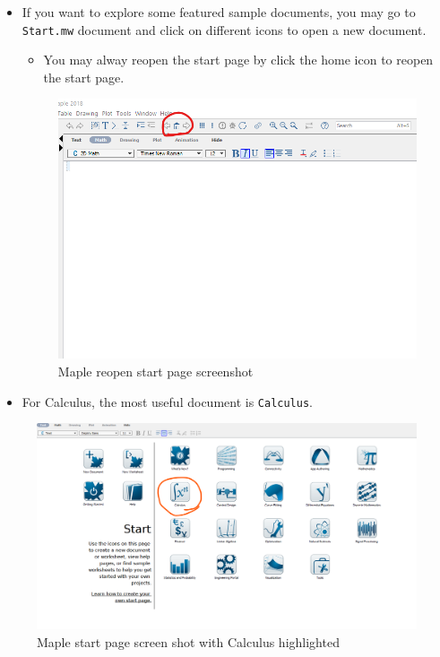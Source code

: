 \documentclass[]{book}
\providecommand{\tightlist}{%
  \setlength{\itemsep}{0pt}\setlength{\parskip}{0pt}}
\theoremstyle{definition}
\theoremstyle{definition}
\theoremstyle{definition}
\theoremstyle{remark}
\begin{document}
\begin{itemize}
\item
  If you want to explore some featured sample documents, you may go to \texttt{Start.mw} document and click on different icons to open a new document.

  \begin{itemize}
  \tightlist
  \item
    You may alway reopen the start page by click the home icon to reopen the start page.
  \end{itemize}

  \begin{figure}
  \centering
  \includegraphics{figs/Home-reopen-start-page.png}
  \caption{Maple reopen start page screenshot}
  \end{figure}
\item
  For Calculus, the most useful document is \texttt{Calculus}.
\end{itemize}

\begin{figure}
\centering
\includegraphics{figs/Start-Page-Calculus.png}
\caption{Maple start page screen shot with Calculus highlighted}
\end{figure}
\end{document}
